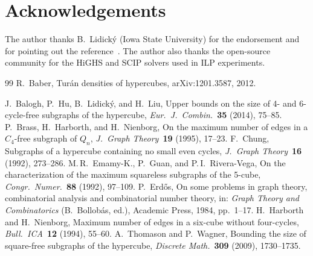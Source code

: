 \documentclass[12pt,a4paper]{article}
\theoremstyle{definition}
\begin{document}
\section*{Acknowledgements}
The author thanks B.~Lidick\'y (Iowa State University) for the endorsement
and for pointing out the reference~\cite{Bab12}.
The author also thanks the open-source community for the HiGHS and SCIP
solvers used in ILP experiments.

\begin{thebibliography}{99}
R.~Baber,
Tur\'an densities of hypercubes,
arXiv:1201.3587, 2012.

 J.~Balogh, P.~Hu, B.~Lidick\'y, and H.~Liu, Upper bounds on
  the size of 4- and 6-cycle-free subgraphs of the hypercube,
  \textit{Eur.\ J.\ Combin.}\ \textbf{35} (2014), 75--85.
 P.~Brass, H.~Harborth, and H.~Nienborg, On the maximum number
  of edges in a $C_4$-free subgraph of $Q_n$,
  \textit{J.\ Graph Theory}\ \textbf{19} (1995), 17--23.
 F.~Chung, Subgraphs of a hypercube containing no small even
  cycles, \textit{J.\ Graph Theory}\ \textbf{16} (1992), 273--286.
 M.\,R.~Emamy-K., P.~Guan, and P.\,I.~Rivera-Vega, On the
  characterization of the maximum squareless subgraphs of the 5-cube,
  \textit{Congr.\ Numer.}\ \textbf{88} (1992), 97--109.
 P.~Erd\H{o}s, On some problems in graph theory, combinatorial
  analysis and combinatorial number theory, in: \textit{Graph Theory and
  Combinatorics} (B.~Bollob\'as, ed.), Academic Press, 1984, pp.~1--17.
 H.~Harborth and H.~Nienborg, Maximum number of edges in a
  six-cube without four-cycles, \textit{Bull.\ ICA}\ \textbf{12} (1994), 55--60.
 A.~Thomason and P.~Wagner, Bounding the size of square-free
  subgraphs of the hypercube, \textit{Discrete Math.}\ \textbf{309} (2009),
  1730--1735.
\end{thebibliography}
\end{document}
